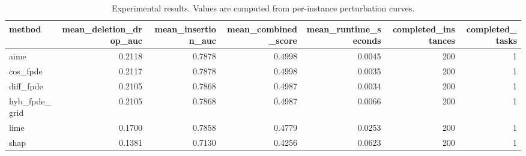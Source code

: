 \begin{table}[t]
\caption{Experimental results. Values are computed from per-instance perturbation curves.}
\label{tab:main_results_computed}
\centering
\begin{tabular}{lrrrrrr}
\toprule
method & mean\_deletion\_drop\_auc & mean\_insertion\_auc & mean\_combined\_score & mean\_runtime\_seconds & completed\_instances & completed\_tasks \\
\midrule
aime & 0.2118 & 0.7878 & 0.4998 & 0.0045 & 200 & 1 \\
cos\_fpde & 0.2117 & 0.7878 & 0.4998 & 0.0035 & 200 & 1 \\
diff\_fpde & 0.2105 & 0.7868 & 0.4987 & 0.0034 & 200 & 1 \\
hyb\_fpde\_grid & 0.2105 & 0.7868 & 0.4987 & 0.0066 & 200 & 1 \\
lime & 0.1700 & 0.7858 & 0.4779 & 0.0253 & 200 & 1 \\
shap & 0.1381 & 0.7130 & 0.4256 & 0.0623 & 200 & 1 \\
\bottomrule
\end{tabular}

\end{table}
